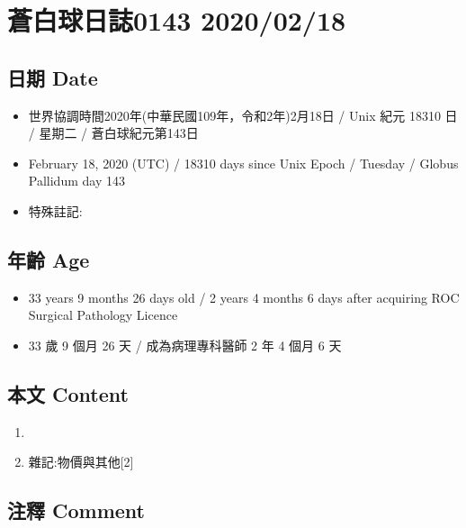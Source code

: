 \documentclass[a5paper, 12pt
]{book}
\providecommand{\tightlist}{%
  \setlength{\itemsep}{0pt}\setlength{\parskip}{0pt}}
\begin{document}
\hypertarget{ux84bcux767dux7403ux65e5ux8a8c0143-20200218}{%
\section{蒼白球日誌0143
2020/02/18}\label{ux84bcux767dux7403ux65e5ux8a8c0143-20200218}}

\hypertarget{ux65e5ux671f-date-79}{%
\subsection{日期 Date}\label{ux65e5ux671f-date-79}}

\begin{itemize}
\tightlist
\item
  世界協調時間2020年(中華民國109年，令和2年)2月18日 / Unix 紀元 18310 日
  / 星期二 / 蒼白球紀元第143日
\item
  February 18, 2020 (UTC) / 18310 days since Unix Epoch / Tuesday /
  Globus Pallidum day 143
\item
  特殊註記:
\end{itemize}

\hypertarget{ux5e74ux9f61-age-79}{%
\subsection{年齡 Age}\label{ux5e74ux9f61-age-79}}

\begin{itemize}
\tightlist
\item
  33 years 9 months 26 days old / 2 years 4 months 6 days after
  acquiring ROC Surgical Pathology Licence
\item
  33 歲 9 個月 26 天 / 成為病理專科醫師 2 年 4 個月 6 天
\end{itemize}

\hypertarget{ux672cux6587-content-79}{%
\subsection{本文 Content}\label{ux672cux6587-content-79}}

\begin{enumerate}
\def\labelenumi{\arabic{enumi}.}
\item
\item
  雜記:物價與其他{[}2{]}
\end{enumerate}

\hypertarget{ux6ce8ux91cb-comment-78}{%
\subsection{注釋 Comment}\label{ux6ce8ux91cb-comment-78}}
\end{document}

